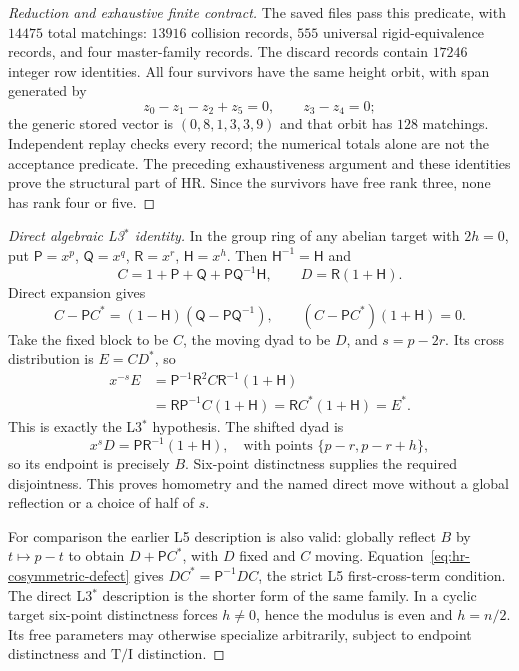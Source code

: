 \documentclass[11pt]{article}
\theoremstyle{remark}
\newcommand{\TI}{\mathrm{T/I}}
\begin{document}
\begin{proof}[Reduction and exhaustive finite contract]
The saved files pass this predicate, with $14475$ total matchings:
$13916$ collision records, $555$ universal rigid-equivalence records,
and four master-family records. The discard records contain $17246$
integer row identities. All four survivors have the same height orbit,
with span generated by
\[
 z_0-z_1-z_2+z_5=0,\qquad z_3-z_4=0;
\]
the generic stored vector is $(0,8,1,3,3,9)$ and that orbit has $128$
matchings. Independent replay checks every record; the numerical totals
alone are not the acceptance predicate. The preceding exhaustiveness
argument and these identities prove the structural part of HR. Since
the survivors have free rank three, none has rank four or five.
\end{proof}

\begin{proof}[Direct algebraic L3$^*$ identity]
In the group ring of any abelian target with $2h=0$, put
$\mathsf P=x^p$, $\mathsf Q=x^q$, $\mathsf R=x^r$, $\mathsf H=x^h$.
Then $\mathsf H^{-1}=\mathsf H$ and
\[
 C=1+\mathsf P+\mathsf Q+\mathsf P\mathsf Q^{-1}\mathsf H,
 \qquad D=\mathsf R(1+\mathsf H).
\]
Direct expansion gives
\begin{equation}\label{eq:hr-cosymmetric-defect}
 C-\mathsf PC^*=(1-\mathsf H)
                    (\mathsf Q-\mathsf P\mathsf Q^{-1}),
 \qquad (C-\mathsf PC^*)(1+\mathsf H)=0.
\end{equation}
Take the fixed block to be $C$, the moving dyad to be $D$, and
$s=p-2r$. Its cross distribution is $E=CD^*$, so
\begin{align*}
 x^{-s}E
 &=\mathsf P^{-1}\mathsf R^2 C\mathsf R^{-1}(1+\mathsf H)\\
 &=\mathsf R\mathsf P^{-1}C(1+\mathsf H)
  =\mathsf R C^*(1+\mathsf H)=E^*.
\end{align*}
This is exactly the L3$^*$ hypothesis. The shifted dyad is
\[
 x^sD=\mathsf P\mathsf R^{-1}(1+\mathsf H),
 \quad\text{with points }\{p-r,p-r+h\},
\]
so its endpoint is precisely $B$. Six-point distinctness supplies the
required disjointness. This proves homometry and the named direct move
without a global reflection or a choice of half of $s$.

For comparison the earlier L5 description is also valid: globally reflect
$B$ by $t\mapsto p-t$ to obtain $D+\mathsf PC^*$, with $D$ fixed and
$C$ moving. Equation~\eqref{eq:hr-cosymmetric-defect} gives
$DC^*=\mathsf P^{-1}DC$, the strict L5 first-cross-term condition.
The direct L3$^*$ description is the shorter form of the same family.
In a cyclic target six-point distinctness forces $h\ne0$, hence the
modulus is even and $h=n/2$. Its free parameters may otherwise specialize
arbitrarily, subject to endpoint distinctness and $\TI$ distinction.
\end{proof}
\end{document}

